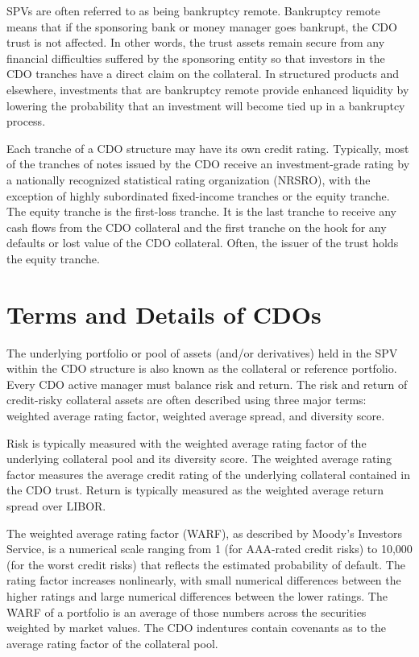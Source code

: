 \documentclass[11pt]{article}
\begin{document}
SPVs are often referred to as being bankruptcy remote. Bankruptcy remote means that if the sponsoring bank or money manager goes bankrupt, the CDO trust is not affected. In other words, the trust assets remain secure from any financial difficulties suffered by the sponsoring entity so that investors in the CDO tranches have a direct claim on the collateral. In structured products and elsewhere, investments that are bankruptcy remote provide enhanced liquidity by lowering the probability that an investment will become tied up in a bankruptcy process.

Each tranche of a CDO structure may have its own credit rating. Typically, most of the tranches of notes issued by the CDO receive an investment-grade rating by a nationally recognized statistical rating organization (NRSRO), with the exception of highly subordinated fixed-income tranches or the equity tranche. The equity tranche is the first-loss tranche. It is the last tranche to receive any cash flows from the CDO collateral and the first tranche on the hook for any defaults or lost value of the CDO collateral. Often, the issuer of the trust holds the equity tranche.

\section*{Terms and Details of CDOs}
The underlying portfolio or pool of assets (and/or derivatives) held in the SPV within the CDO structure is also known as the collateral or reference portfolio. Every CDO active manager must balance risk and return. The risk and return of credit-risky collateral assets are often described using three major terms: weighted average rating factor, weighted average spread, and diversity score.

Risk is typically measured with the weighted average rating factor of the underlying collateral pool and its diversity score. The weighted average rating factor measures the average credit rating of the underlying collateral contained in the CDO trust. Return is typically measured as the weighted average return spread over LIBOR.

The weighted average rating factor (WARF), as described by Moody's Investors Service, is a numerical scale ranging from 1 (for AAA-rated credit risks) to 10,000 (for the worst credit risks) that reflects the estimated probability of default. The rating factor increases nonlinearly, with small numerical differences between the higher ratings and large numerical differences between the lower ratings. The WARF of a portfolio is an average of those numbers across the securities weighted by market values. The CDO indentures contain covenants as to the average rating factor of the collateral pool.
\end{document}

